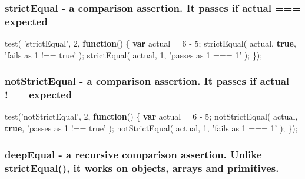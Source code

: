\documentclass[9pt]{book}
\newenvironment{Shaded}{}{}
\newcommand{\KeywordTok}[1]{\textcolor[rgb]{0.00,0.44,0.13}{\textbf{{#1}}}}
\newcommand{\DecValTok}[1]{\textcolor[rgb]{0.25,0.63,0.44}{{#1}}}
\newcommand{\StringTok}[1]{\textcolor[rgb]{0.25,0.44,0.63}{{#1}}}
\newcommand{\FunctionTok}[1]{\textcolor[rgb]{0.02,0.16,0.49}{{#1}}}
\newcommand{\NormalTok}[1]{{#1}}
\begin{document}
\subsubsection{strictEqual - a comparison assertion. It passes if actual
===
expected}\label{strictequal---a-comparison-assertion.-it-passes-if-actual-expected}

\begin{Shaded}
\begin{Highlighting}[]
\FunctionTok{test}\NormalTok{( }\StringTok{'strictEqual'}\NormalTok{, }\DecValTok{2}\NormalTok{, }\KeywordTok{function}\NormalTok{() \{}
  \KeywordTok{var} \NormalTok{actual = }\DecValTok{6} \NormalTok{- }\DecValTok{5}\NormalTok{;}
  \FunctionTok{strictEqual}\NormalTok{( actual, }\KeywordTok{true}\NormalTok{,  }\StringTok{'fails as 1 !== true'} \NormalTok{);}
  \FunctionTok{strictEqual}\NormalTok{( actual, }\DecValTok{1}\NormalTok{,     }\StringTok{'passes as 1 === 1'} \NormalTok{);}
\NormalTok{\});}
\end{Highlighting}
\end{Shaded}

\subsubsection{notStrictEqual - a comparison assertion. It passes if
actual !==
expected}\label{notstrictequal---a-comparison-assertion.-it-passes-if-actual-expected}

\begin{Shaded}
\begin{Highlighting}[]
\FunctionTok{test}\NormalTok{(}\StringTok{'notStrictEqual'}\NormalTok{, }\DecValTok{2}\NormalTok{, }\KeywordTok{function}\NormalTok{() \{}
  \KeywordTok{var} \NormalTok{actual = }\DecValTok{6} \NormalTok{- }\DecValTok{5}\NormalTok{;}
  \FunctionTok{notStrictEqual}\NormalTok{( actual, }\KeywordTok{true}\NormalTok{,  }\StringTok{'passes as 1 !== true'} \NormalTok{);}
  \FunctionTok{notStrictEqual}\NormalTok{( actual, }\DecValTok{1}\NormalTok{,     }\StringTok{'fails as 1 === 1'} \NormalTok{);}
\NormalTok{\});}
\end{Highlighting}
\end{Shaded}

\subsubsection{deepEqual - a recursive comparison assertion. Unlike
strictEqual(), it works on objects, arrays and
primitives.}\label{deepequal---a-recursive-comparison-assertion.-unlike-strictequal-it-works-on-objects-arrays-and-primitives.}
\end{document}
